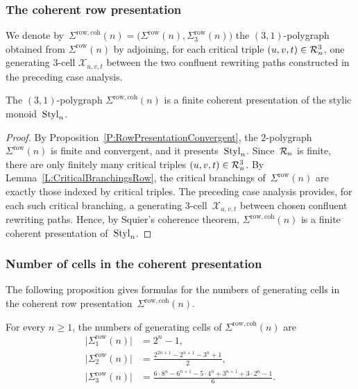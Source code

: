 \documentclass[a4paper, twoside, 11pt, english]{article}
\begin{document}
\subsubsection{The coherent row presentation}

We denote by~$\Sigma^{\mathrm{row,coh}}(n)=\bigl(\Sigma^{\mathrm{row}}(n),\Sigma^{\mathrm{row}}_3(n)\bigr)$ the $(3,1)$-polygraph obtained from $\Sigma^{\mathrm{row}}(n)$ by adjoining,
for each critical triple $(u,v,t)\in\mathcal{R}_n^3$, one generating $3$-cell
$\mathcal{X}_{u,v,t}$ between the two confluent rewriting paths constructed
in the preceding case analysis.



\begin{theorem}
\label{T:CoherentPresentation}
The $(3,1)$-polygraph $\Sigma^{\mathrm{row,coh}}(n)$ is a finite coherent
presentation of the stylic monoid~$\mathrm{Styl}_n$.
\end{theorem}

\begin{proof}
By Proposition~\ref{P:RowPresentationConvergent}, the $2$-polygraph~$\Sigma^{\mathrm{row}}(n)$ is finite and convergent, and it presents~$\mathrm{Styl}_n$. 
Since~$\mathcal{R}_n$ is finite, there are only finitely many critical
triples $(u,v,t)\in\mathcal{R}_n^3$. 
By Lemma~\ref{L:CriticalBranchingsRow}, the
critical branchings of~$\Sigma^{\mathrm{row}}(n)$ are exactly those indexed by
critical triples. The preceding case analysis provides, for each such critical
branching, a generating $3$-cell~$\mathcal X_{u,v,t}$ between chosen confluent
rewriting paths. 
Hence, by Squier's coherence theorem,
$\Sigma^{\mathrm{row,coh}}(n)$ is a finite coherent presentation of~$\mathrm{Styl}_n$.
\end{proof}

\subsubsection{Number of cells in the coherent presentation}
The following proposition gives formulas for the
numbers of generating cells in the coherent row presentation~$\Sigma^{\mathrm{row,coh}}(n)$.

\begin{proposition}
\label{Prop:CountingCells}
For every $n\geq1$, the numbers of generating cells of
$\Sigma^{\mathrm{row,coh}}(n)$ are
\begin{align}
\bigl|\Sigma^{\mathrm{row}}_1(n)\bigr|
&=
2^n-1,
\label{eq:CountRowCellsOne}
\\
\bigl|\Sigma^{\mathrm{row}}_2(n)\bigr|
&=
\frac{2^{2n+1}-2^{n+1}-3^n+1}{2},
\label{eq:CountRowCellsTwo}
\\
\bigl|\Sigma^{\mathrm{row}}_3(n)\bigr|
&=
\frac{
6\cdot8^n-6^{n+1}-5\cdot4^n+3^{n+1}+3\cdot2^n-1
}{6}.
\label{eq:CountRowCellsThree}
\end{align}
\end{proposition}
\end{document}

